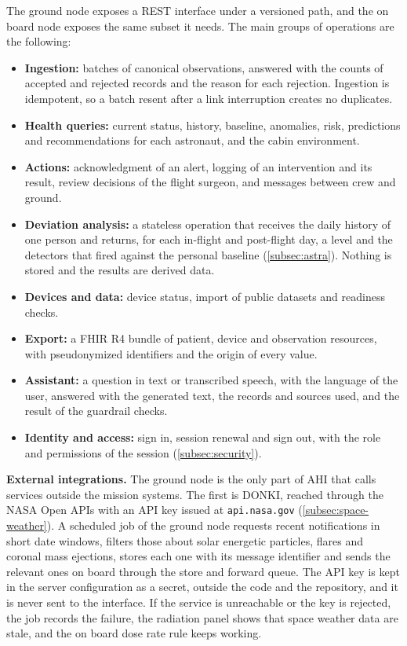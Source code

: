 The ground node exposes a REST interface under a versioned path, and the on board node exposes the same subset it needs. The main groups of operations are the following:

\begin{itemize}
\item \textbf{Ingestion:} batches of canonical observations, answered with the counts of accepted and rejected records and the reason for each rejection. Ingestion is idempotent, so a batch resent after a link interruption creates no duplicates.
\item \textbf{Health queries:} current status, history, baseline, anomalies, risk, predictions and recommendations for each astronaut, and the cabin environment.
\item \textbf{Actions:} acknowledgment of an alert, logging of an intervention and its result, review decisions of the flight surgeon, and messages between crew and ground.
\item \textbf{Deviation analysis:} a stateless operation that receives the daily history of one person and returns, for each in-flight and post-flight day, a level and the detectors that fired against the personal baseline (\ref{subsec:astra}). Nothing is stored and the results are derived data.
\item \textbf{Devices and data:} device status, import of public datasets and readiness checks.
\item \textbf{Export:} a FHIR R4 bundle of patient, device and observation resources, with pseudonymized identifiers and the origin of every value.
\item \textbf{Assistant:} a question in text or transcribed speech, with the language of the user, answered with the generated text, the records and sources used, and the result of the guardrail checks.
\item \textbf{Identity and access:} sign in, session renewal and sign out, with the role and permissions of the session (\ref{subsec:security}).
\end{itemize}

\medskip\noindent\textbf{External integrations.} The ground node is the only part of AHI that calls services outside the mission systems. The first is DONKI, reached through the NASA Open APIs with an API key issued at \texttt{api.nasa.gov} \cite{nasa_donki,nasa_open_apis} (\ref{subsec:space-weather}). A scheduled job of the ground node requests recent notifications in short date windows, filters those about solar energetic particles, flares and coronal mass ejections, stores each one with its message identifier and sends the relevant ones on board through the store and forward queue. The API key is kept in the server configuration as a secret, outside the code and the repository, and it is never sent to the interface. If the service is unreachable or the key is rejected, the job records the failure, the radiation panel shows that space weather data are stale, and the on board dose rate rule keeps working.


